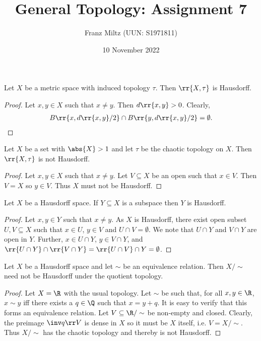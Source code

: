 \documentclass{article}
\begin{document}
\title{General Topology: Assignment 7}
\author{Franz Miltz (UUN: S1971811)}
\date{10 November 2022}
\maketitle

\begin{claim*}
  Let $X$ be a metric space with induced topology $\tau$. Then $\rr{X,\tau}$ is Hausdorff.
  \begin{proof}
    Let $x,y\in X$ such that $x\neq y$. Then $d\rr{x,y}>0$. Clearly,
    \begin{align*}
      B\rr{x,d\rr{x,y}/2}\cap B\rr{y,d\rr{x,y}/2} = \emptyset.
    \end{align*}
  \end{proof}
\end{claim*}

\begin{claim*}
  Let $X$ be a set with $\abs{X}>1$ and let $\tau$ be the chaotic topology on $X$. Then
  $\rr{X,\tau}$ is not Hausdorff.
  \begin{proof}
    Let $x,y\in X$ such that $x\neq y$. Let $V\subseteq X$ be an open such that $x\in V$. Then
    $V=X$ so $y\in V$. Thus $X$ must not be Hausdorff.
  \end{proof}
\end{claim*}

\begin{claim*}
  Let $X$ be a Hausdorff space. If $Y\subseteq X$ is a subspace then $Y$ is Hausdorff.
  \begin{proof}
    Let $x,y\in Y$ such that $x\neq y$. As $X$ is Hausdorff, there exist open subset
    $U,V\subseteq X$ such that $x\in U$, $y\in V$ and $U\cap V=\emptyset$. We note that
    $U\cap Y$ and $V\cap Y$ are open in $Y$. Further, $x\in U\cap Y$, $y\in V\cap Y$, and
    $\rr{U\cap Y}\cap \rr{V\cap Y}=\rr{U\cap V}\cap Y=\emptyset$.
  \end{proof}
\end{claim*}

\begin{claim*}
  Let $X$ be a Hausdorff space and let $\sim$ be an equivalence relation. Then $X/\sim$
  need not be Hausdorff under the quotient topology.
  \begin{proof}
    Let $X=\R$ with the usual topology. Let $\sim$ be such that, for all $x,y\in\R$,
    $x\sim y$ iff there exists a $q\in\Q$ such that $x=y+q$. It is easy to verify that this
    forms an equivalence relation. Let $V\subseteq\R/\sim$ be non-empty and closed.
    Clearly, the preimage $\inv q\rr V$ is dense in $X$ so it must be $X$ itself, i.e. $V=X/\sim$.
    Thus $X/\sim$ has the chaotic topology and thereby is not Hausdorff.
  \end{proof}
\end{claim*}
\end{document}
